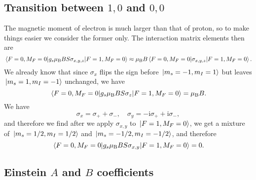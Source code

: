 \documentclass[hyperref, a4paper]{article}
\newcommand*{\ii}{\mathrm{i}}
\newcommand*{\muB}{\mu_{\text{B}}}
\begin{document}
\subsection{Transition between $1, 0$ and $0, 0$}

The magnetic moment of electron is much larger than that of proton,
so to make things easier we consider the former only.
The interaction matrix elements then are 
\begin{equation}
    \mel{F=0, M_F = 0}{g_s \mu_{\text{B}} B S \sigma_{x, y, z}}{F=1, M_F = 0}
    \approx \muB B \mel{F=0, M_F = 0}{\sigma_{x, y, z}}{F=1, M_F = 0}.
\end{equation}
We already know that since $\sigma_x$ flips the sign before $\ket*{m_s = -1, m_I = 1}$
but leaves $\ket*{m_s = 1, m_I = -1}$ unchanged, 
we have 
\begin{equation}
    \mel{F=0, M_F = 0}{g_s \mu_{\text{B}} B S \sigma_{z}}{F=1, M_F = 0} = \muB B.
\end{equation}
We have 
\begin{equation}
    \sigma_x = \sigma_+ + \sigma_- , \quad 
    \sigma_y = - \ii \sigma_+ + \ii \sigma_-,
\end{equation}
and therefore we find after we apply $\sigma_{x, y}$ to $\ket*{F = 1, M_F = 0}$,
we get a mixture of $\ket*{m_s = 1/2, m_I = 1/2}$ 
and $\ket*{m_s = - 1/2, m_I = - 1/2}$, and therefore
\begin{equation}
    \mel{F=0, M_F = 0}{g_s \mu_{\text{B}} B S \sigma_{x, y}}{F=1, M_F = 0} = 0.
\end{equation}

\subsection{Einstein $A$ and $B$ coefficients}
\end{document}
